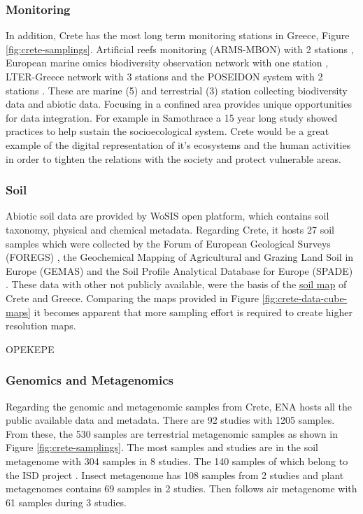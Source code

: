 \documentclass[a4paper,12pt]{article}
\begin{document}
\subsubsection{Monitoring}
In addition, Crete has the most long term monitoring stations in Greece, Figure \ref{fig:crete-samplings}.
Artificial reefs monitoring (ARMS-MBON) with 2 stations \parencite{obst2020arms},
European marine omics biodiversity observation network with one station \parencite{santi2023emobon},
LTER-Greece network with 3 stations \parencite{Skoulikidis2021lter} and the POSEIDON system with 2 stations \parencite{ntoumas2022}. 
These are marine (5) and terrestrial (3) station collecting biodiversity data and abiotic data.
Focusing in a confined area provides unique opportunities for data integration.
For example in Samothrace \parencite{noll2024insights} a 15 year long study 
showed practices to help sustain the socioecological system.
Crete would be a great example of the digital representation of it's ecosystems
and the human activities in order to tighten the relations with the society and 
protect vulnerable areas.

\subsubsection{Soil}
Abiotic soil data are provided by WoSIS open platform,
which contains soil taxonomy, physical and chemical metadata. 
Regarding Crete, it hosts 27 soil samples which were collected by
the Forum of European Geological Surveys (FOREGS) \parencite{nerc19017},
the Geochemical Mapping of Agricultural and Grazing Land
Soil in Europe (GEMAS) \parencite{reimann2018gemas} and the Soil Profile Analytical
Database for Europe (SPADE) \parencite{Hiederer2006}.
These data with other not publicly available,
were the basis of the \href{https://esdac.jrc.ec.europa.eu/content/soil-map-greece-0}{soil map} of Crete 
and Greece. 
Comparing the maps provided in Figure \ref{fig:crete-data-cube-maps} 
it becomes apparent that more sampling effort is required to create higher resolution maps. 


OPEKEPE \parencite{gerontidis2025assessment}


\parencite{stagiopoulou2025altitudes}

\subsubsection{Genomics and Metagenomics}
Regarding the genomic and metagenomic samples from Crete, ENA hosts all the public 
available data and metadata. There are 92 studies with 1205 samples.
From these, the 530 samples are terrestrial metagenomic samples as shown in
Figure \ref{fig:crete-samplings}. 
The most samples and studies are in the soil metagenome with 304 samples in 8 studies.
The 140 samples of which belong to the
ISD project \parencite{holm2025first}.
Insect metagenome has 108 samples from 2 studies
and plant metagenomes contains 69 samples in 2 studies.
Then follows air metagenome with 61 samples during 3 studies.
\end{document}
